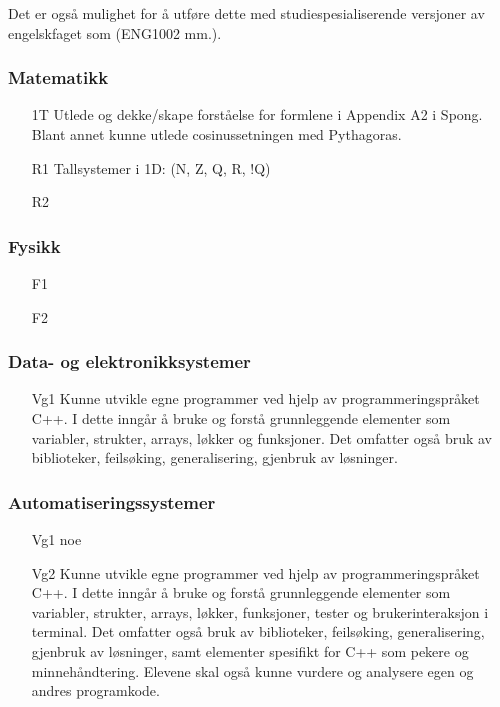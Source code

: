 		Det er også mulighet for å utføre dette med studiespesialiserende versjoner av engelskfaget som (ENG1002 mm.).


	\subsubsection*{Matematikk}

		\begin{itemize}

			\item[1T]  Utlede og dekke/skape forståelse for formlene i Appendix A2 i Spong. Blant annet kunne utlede cosinussetningen med Pythagoras.
			\item[R1]  Tallsystemer i 1D: (N, Z, Q, R, !Q)
			\item[R2]

		\end{itemize}


	\subsubsection*{Fysikk}

		\begin{itemize}

			\item[F1]
			\item[F2]

		\end{itemize}

	\subsubsection*{Data- og elektronikksystemer}

		\begin{itemize}

			\item[Vg1] Kunne utvikle egne programmer ved hjelp av programmeringspråket C++. I dette inngår å bruke og forstå grunnleggende elementer som variabler, strukter, arrays, løkker og funksjoner. Det omfatter også bruk av biblioteker, feilsøking, generalisering, gjenbruk av løsninger.

		\end{itemize}


	\subsubsection*{Automatiseringssystemer}

		\begin{itemize}

			\item[Vg1] noe

			\item[Vg2] Kunne utvikle egne programmer ved hjelp av programmeringspråket C++. I dette inngår å bruke og forstå grunnleggende elementer som variabler, strukter, arrays, løkker, funksjoner, tester og brukerinteraksjon i terminal. Det omfatter også bruk av biblioteker, feilsøking, generalisering, gjenbruk av løsninger, samt elementer spesifikt for C++ som pekere og minnehåndtering. Elevene skal også kunne vurdere og analysere egen og andres programkode.

		\end{itemize}
